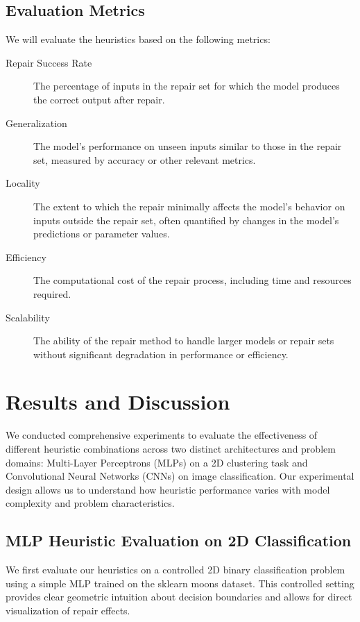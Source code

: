 \documentclass{article}
\begin{document}
\subsection{Evaluation Metrics}
We will evaluate the heuristics based on the following metrics:
\begin{description}
	\item[Repair Success Rate] The percentage of inputs in the repair set for which the model produces the correct output after repair.
	\item[Generalization] The model's performance on unseen inputs similar to those in the repair set, measured by accuracy or other relevant metrics.
	\item[Locality] The extent to which the repair minimally affects the model's behavior on inputs outside the repair set, often quantified by changes in the model's predictions or parameter values.
	\item[Efficiency] The computational cost of the repair process, including time and resources required.
	\item[Scalability] The ability of the repair method to handle larger models or repair sets without significant degradation in performance or efficiency.
\end{description}

\section{Results and Discussion}

We conducted comprehensive experiments to evaluate the effectiveness of different heuristic combinations across two distinct architectures and problem domains: Multi-Layer Perceptrons (MLPs) on a 2D clustering task and Convolutional Neural Networks (CNNs) on image classification. Our experimental design allows us to understand how heuristic performance varies with model complexity and problem characteristics.

\subsection{MLP Heuristic Evaluation on 2D Classification}

We first evaluate our heuristics on a controlled 2D binary classification problem using a simple MLP trained on the sklearn moons dataset. This controlled setting provides clear geometric intuition about decision boundaries and allows for direct visualization of repair effects.
\end{document}
